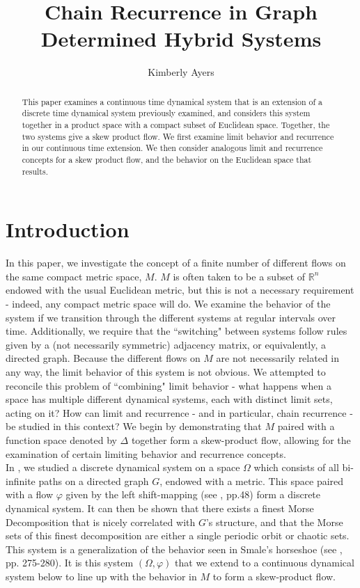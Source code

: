\documentclass[11pt]{article}
\title{Chain Recurrence in Graph Determined Hybrid Systems}
\author{Kimberly Ayers}
\date{}
\begin{document}
\maketitle

\begin{abstract}
This paper examines a continuous time dynamical system that is an extension of a discrete time dynamical system previously examined, and considers this system together in a product space with a compact subset of Euclidean space. Together, the two systems give a skew product flow.  We first examine limit behavior and recurrence in our continuous time extension.  We then consider analogous limit and recurrence concepts for a skew product flow, and the behavior on the Euclidean space that results. 
\end{abstract}
\section{Introduction}
\vspace{2mm}


\indent In this paper, we investigate the concept of a finite number of different flows on the same compact metric space, $M$.  $M$ is often taken to be a subset of $\mathbb{R}^n$ endowed with the usual Euclidean metric, but this is not a necessary requirement - indeed, any compact metric space will do.  We examine the behavior of the system if we transition through the different systems at regular intervals over time.  Additionally, we require that the ``switching" between systems follow rules given by a (not necessarily symmetric) adjacency matrix, or equivalently, a directed graph.  Because the different flows on $M$ are not necessarily related in any way, the limit behavior of this system is not obvious.  We attempted to reconcile this problem of ``combining" limit behavior - what happens when a space has multiple different dynamical systems, each with distinct limit sets, acting on it?  How can limit and recurrence - and in particular, chain recurrence - be studied in this context? We begin by demonstrating that $M$ paired with a function space denoted by $\Delta$ together form a skew-product flow, allowing for the examination of certain limiting behavior and recurrence concepts. \\
\indent In \cite{discretesystems}, we studied a discrete dynamical system on a space $\Omega$ which consists of all bi-infinite paths on a directed graph $G$, endowed with a metric.   This space paired with a flow $\varphi$ given by the left shift-mapping (see \cite{Katok}, pp.48) form a discrete dynamical system.  It can then be shown that there exists a finest Morse Decomposition that is nicely correlated with $G$'s structure, and that the Morse sets of this finest decomposition are either a single periodic orbit or chaotic sets.  This system is a generalization of the behavior seen in Smale's horseshoe (see 
\cite{Robinson}, pp. 275-280).  It is this system $(\Omega, \varphi)$ that we extend to a continuous dynamical system below to line up with the behavior in $M$ to form a skew-product flow.\\
\end{document}
